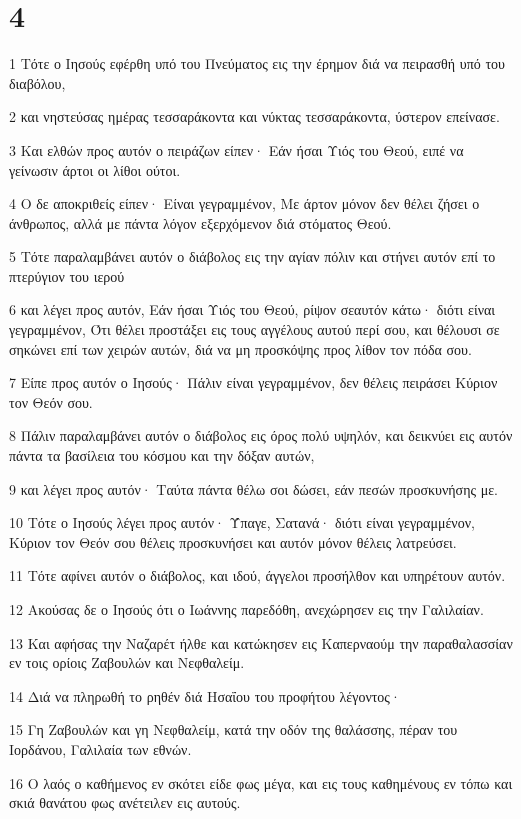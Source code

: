 \chapter{4}

\par 1 Τότε ο Ιησούς εφέρθη υπό του Πνεύματος εις την έρημον διά να πειρασθή υπό του διαβόλου,
\par 2 και νηστεύσας ημέρας τεσσαράκοντα και νύκτας τεσσαράκοντα, ύστερον επείνασε.
\par 3 Και ελθών προς αυτόν ο πειράζων είπεν· Εάν ήσαι Υιός του Θεού, ειπέ να γείνωσιν άρτοι οι λίθοι ούτοι.
\par 4 Ο δε αποκριθείς είπεν· Είναι γεγραμμένον, Με άρτον μόνον δεν θέλει ζήσει ο άνθρωπος, αλλά με πάντα λόγον εξερχόμενον διά στόματος Θεού.
\par 5 Τότε παραλαμβάνει αυτόν ο διάβολος εις την αγίαν πόλιν και στήνει αυτόν επί το πτερύγιον του ιερού
\par 6 και λέγει προς αυτόν, Εάν ήσαι Υιός του Θεού, ρίψον σεαυτόν κάτω· διότι είναι γεγραμμένον, Ότι θέλει προστάξει εις τους αγγέλους αυτού περί σου, και θέλουσι σε σηκώνει επί των χειρών αυτών, διά να μη προσκόψης προς λίθον τον πόδα σου.
\par 7 Είπε προς αυτόν ο Ιησούς· Πάλιν είναι γεγραμμένον, δεν θέλεις πειράσει Κύριον τον Θεόν σου.
\par 8 Πάλιν παραλαμβάνει αυτόν ο διάβολος εις όρος πολύ υψηλόν, και δεικνύει εις αυτόν πάντα τα βασίλεια του κόσμου και την δόξαν αυτών,
\par 9 και λέγει προς αυτόν· Ταύτα πάντα θέλω σοι δώσει, εάν πεσών προσκυνήσης με.
\par 10 Τότε ο Ιησούς λέγει προς αυτόν· Ύπαγε, Σατανά· διότι είναι γεγραμμένον, Κύριον τον Θεόν σου θέλεις προσκυνήσει και αυτόν μόνον θέλεις λατρεύσει.
\par 11 Τότε αφίνει αυτόν ο διάβολος, και ιδού, άγγελοι προσήλθον και υπηρέτουν αυτόν.
\par 12 Ακούσας δε ο Ιησούς ότι ο Ιωάννης παρεδόθη, ανεχώρησεν εις την Γαλιλαίαν.
\par 13 Και αφήσας την Ναζαρέτ ήλθε και κατώκησεν εις Καπερναούμ την παραθαλασσίαν εν τοις ορίοις Ζαβουλών και Νεφθαλείμ.
\par 14 Διά να πληρωθή το ρηθέν διά Ησαΐου του προφήτου λέγοντος·
\par 15 Γη Ζαβουλών και γη Νεφθαλείμ, κατά την οδόν της θαλάσσης, πέραν του Ιορδάνου, Γαλιλαία των εθνών.
\par 16 Ο λαός ο καθήμενος εν σκότει είδε φως μέγα, και εις τους καθημένους εν τόπω και σκιά θανάτου φως ανέτειλεν εις αυτούς.
